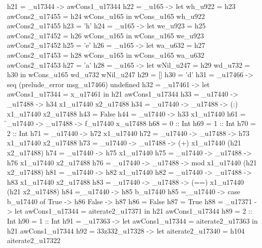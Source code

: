          h21 = _u17344 -> awCons1_u17344
         h22 = \wCons_u165 -> let
                                wh_u922 = h23
                                awCons2_u17455 = h24 wCons_u165
                              in wCons_u165 wh_u922 awCons2_u17455
         h23 = 'h'
         h24 = \wCons_u165 -> let
                                we_u923 = h25
                                awCons2_u17452 = h26 wCons_u165
                              in wCons_u165 we_u923 awCons2_u17452
         h25 = 'e'
         h26 = \wCons_u165 -> let
                                wa_u632 = h27
                                awCons2_u17453 = h28 wCons_u165
                              in wCons_u165 wa_u632 awCons2_u17453
         h27 = 'a'
         h28 = \wCons_u165 -> let
                                wNil_u247 = h29
                                wd_u732 = h30
                              in wCons_u165 wd_u732 wNil_u247
         h29 = []
         h30 = 'd'
         h31 = \msg_u17466 -> seq (prelude_error msg_u17466) undefined
         h32 = \x_u17461 -> let awCons1_u17344 = x_u17461
                            in h21 awCons1_u17344
         h33 = _u17440 -> _u17488 -> h34 x1_u17440 x2_u17488
         h34 = _u17440 -> _u17488 -> (:) x1_u17440 x2_u17488
         h43 = False
         h44 = _u17440 -> h33 x1_u17440
         h61 = \f_u17440 -> \x_u17488 -> f_u17440 x_u17488
         h68 = 0 :: Int
         h69 = 1 :: Int
         h70 = 2 :: Int
         h71 = _u17440 -> h72 x1_u17440
         h72 = _u17440 -> _u17488 -> h73 x1_u17440 x2_u17488
         h73 = _u17440 -> _u17488 -> (+) x1_u17440 (h21 x2_u17488)
         h74 = _u17440 -> h75 x1_u17440
         h75 = _u17440 -> _u17488 -> h76 x1_u17440 x2_u17488
         h76 = _u17440 -> _u17488 -> mod x1_u17440 (h21 x2_u17488)
         h81 = _u17440 -> h82 x1_u17440
         h82 = _u17440 -> _u17488 -> h83 x1_u17440 x2_u17488
         h83 = _u17440 -> _u17488 -> (==) x1_u17440 (h21 x2_u17488)
         h84 = \b_u17440 -> h85 b_u17440
         h85 = \b_u17440 -> case b_u17440 of
                              True -> h86
                              False -> h87
         h86 = False
         h87 = True
         h88 = _u17371 -> let awCons1_u17344 = aiterate2_u17371
                                    in h21 awCons1_u17344
         h89 = 2 :: Int
         h90 = 1 :: Int
         h91 = _u17363 -> let awCons1_u17344 = aiterate2_u17363
                                    in h21 awCons1_u17344
         h92 = \az33z332_u17328 -> let
                                     aiterate2_u17340 = h104 aiterate2_u17322
